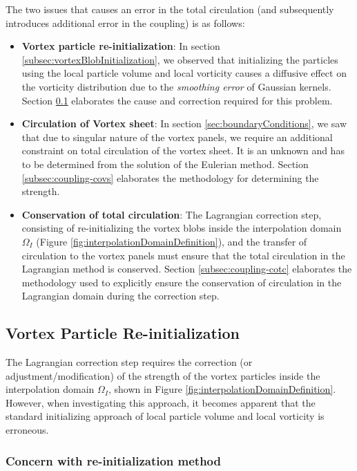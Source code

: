 The two issues that causes an error in the total circulation (and subsequently introduces additional error in the coupling) is as follows:
	\begin{itemize}
	\item \textbf{Vortex particle re-initialization}: In section \ref{subsec:vortexBlobInitialization}, we observed that initializing the particles using the local particle volume and local vorticity causes a diffusive effect on the vorticity distribution due to the \textit{smoothing error} of Gaussian kernels. Section 	\ref{subsec:coupling-vpri} elaborates the cause and correction required for this problem.
	
	\item \textbf{Circulation of Vortex sheet}: In section \ref{sec:boundaryConditions}, we saw that due to singular nature of the vortex panels, we require an additional constraint on total circulation of the vortex sheet. It is an unknown and has to be determined from the solution of the Eulerian method. Section \ref{subsec:coupling-covs} elaborates the methodology for determining the strength.
	\item \textbf{Conservation of total circulation}: The Lagrangian correction step, consisting of re-initializing the vortex blobs inside the interpolation domain $\Omega_I$ (Figure \ref{fig:interpolationDomainDefinition}), and the transfer of circulation to the vortex panels must ensure that the total circulation in the Lagrangian method is conserved. Section \ref{subsec:coupling-cotc} elaborates the methodology used to explicitly ensure the conservation of circulation in the Lagrangian domain during the correction step.
	\end{itemize}

	\subsection{Vortex Particle Re-initialization}
	\label{subsec:coupling-vpri}
	
	The Lagrangian correction step requires the correction (or adjustment/modification) of the strength of the vortex particles inside the interpolation domain $\Omega_{I}$, shown in Figure \ref{fig:interpolationDomainDefinition}.
	However, when investigating this approach, it becomes apparent that the standard initializing approach of local particle volume and local vorticity is erroneous.
		
	\subsubsection*{Concern with re-initialization method}

